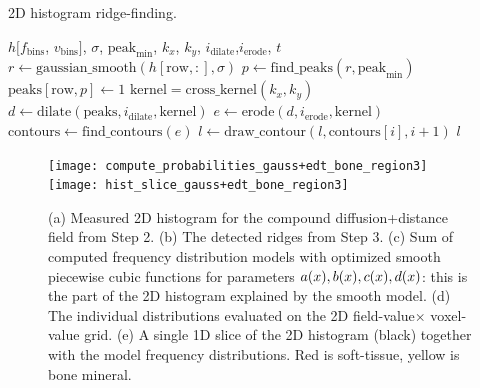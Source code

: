 \begin{algorithm}
    \caption{2D histogram ridge-finding.}
    \label{alg:material}
    \begin{algorithmic}
         {$h[f_\text{bins}$, $v_\text{bins}]$, $\sigma$, $\text{peak}_\text{min}$, $k_x$, $k_y$, \newline \indent \indent $i_\text{dilate}$,$i_\text{erode}$, $t$}
                \State $r \gets \text{gaussian\_smooth}(h[\text{row},:], \sigma)$
                \State $p \gets \text{find\_peaks}(r, \text{peak}_\text{min})$
                \State $\text{peaks}[\text{row}, p] \gets 1$
            \EndFor
            \State $\text{kernel} = \text{cross\_kernel}(k_x, k_y)$
            \State $d \gets \text{dilate}(\text{peaks}, i_{\text{dilate}}, \text{kernel})$
            \State $e \gets \text{erode}(d, i_{\text{erode}}, \text{kernel})$
            \State $\text{contours} \gets \text{find\_contours}(e)$
                    \State $l \gets \text{draw\_contour}(l, \text{contours}[i], i+1)$
                \EndIf
            \EndFor
            \State \Return $l$
        \EndFunction
    \end{algorithmic}
\end{algorithm}

\begin{figure}
  \centering
  \texttt{[image: compute\_probabilities\_gauss+edt\_bone\_region3]}\\
  \texttt{[image: hist\_slice\_gauss+edt\_bone\_region3]}\\
  \caption{(a) Measured 2D histogram for the compound diffusion+distance field from Step 2. (b)
    The detected ridges from Step 3. (c) Sum of computed frequency distribution models
    with optimized smooth piecewise cubic functions for parameters $a(x), b(x), c(x), d(x)$:
    this is the part of the 2D histogram explained by the smooth model. (d) The individual distributions evaluated
    on the 2D field-value$\times$ voxel-value grid. (e) A single 1D slice of the 2D histogram (black) together with
    the model frequency distributions. Red is soft-tissue, yellow is bone mineral.
  }
  \label{fig:curves-and-more}
\end{figure}


